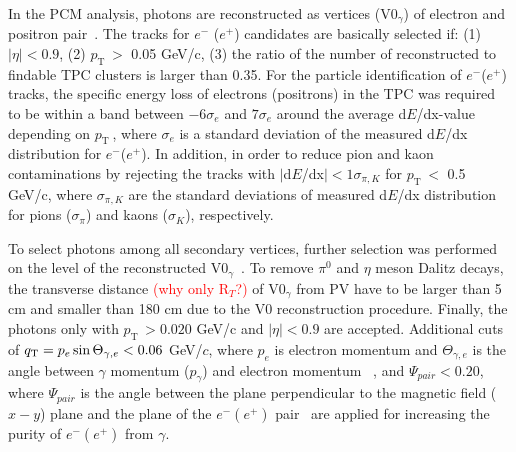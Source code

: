 \documentclass[ALICE,manyauthors]{cernphprep}
\newcommand{\pt}{\ensuremath{p_{\mathrm{T}\; }}}
\newcommand{\red}{\textcolor{red}}
\begin{document}
In the PCM analysis,  photons are reconstructed as vertices (V0$_{\gamma}$) of  electron and positron 
pair~\cite{cite:pi0-2012,cite:ALICE2014-pi0-pp-pPb-2.76TeV,cite:ALICE-DirPhot2016,cite:ALICE-pi0eta-2018}.
The tracks for $e^-$ ($e^+$) candidates are basically selected if: (1) $|\eta| <0.9$, (2) \pt $>$ 0.05 GeV/c, 
(3) the ratio of the number of reconstructed to findable TPC  clusters is larger than 0.35.
For the particle identification of $e^-$($e^+$) tracks, the specific energy loss of electrons (positrons) in the TPC
was required to be within a band between $-6\sigma_{e}$ and $7\sigma_{e}$ around the
average d$E$/dx-value depending on \pt, where $\sigma_{e}$ is a standard deviation
of the measured d$E$/dx distribution for $e^-$($e^+$).
In addition,  in order to reduce pion and kaon contaminations by rejecting the tracks with $|$d$E$/dx$|<1\sigma_{\pi, K}$ 
for \pt $<$ 0.5 GeV/c, where $\sigma_{\pi, K}$ are the standard deviations of measured d$E$/dx 
distribution for pions ($\sigma_{\pi}$) and kaons ($\sigma_{K}$), respectively. 

To select photons among all secondary vertices, further selection was performed on the level of the 
reconstructed  V0$_{\gamma}$~\cite{cite:ALICE-DirPhot2016,cite:pi0-2012}. 
To remove $\pi^0$ and $\eta$ meson Dalitz decays, the transverse distance \red{(why only R$_T$?)} 
of V0$_{\gamma}$ from PV have to be larger than 5 cm and smaller than 180 cm due to the V0 reconstruction 
procedure. Finally, the photons only with \pt $> 0.020$ GeV/c and $|\eta| <0.9$ are accepted.
Additional cuts of $q_{\rm{T}} = p_e \sin{\Theta_{\gamma,e}}<0.06$ GeV/$c$, where $p_e$ is electron momentum and
$\Theta_{\gamma,e}$ is the angle between  $\gamma$ momentum ($p_\gamma$) and electron momentum
~\cite{cite:ArPod}, and $\Psi_{pair} < 0.20$, where $\Psi_{pair}$ is the angle between the plane perpendicular to 
the magnetic field ($x-y$) plane and the plane of the $e^-(e^+)$ pair~\cite{cite:ALICE-pi0eta-2018}
are applied for increasing the purity of $e^-(e^+)$ from $\gamma$.
\end{document}
